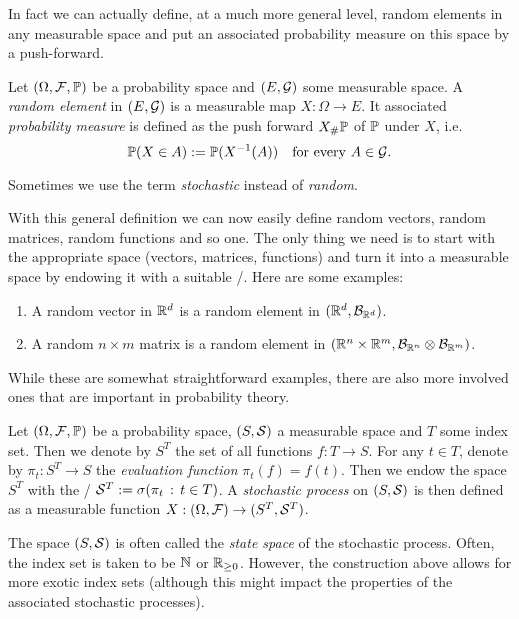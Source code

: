 In fact we can actually define, at a much more general level, random elements in any measurable space and put an associated probability measure on this space by a push-forward.

\begin{definition}
Let $(\Omega,\mathcal F, \mathbb P)$ be a probability space and $(E,\mathcal G)$ some measurable space. A \emph{random element} in $(E,\mathcal G)$ is a measurable map $X : \Omega \to E$. It associated \emph{probability measure} is defined as the push forward $X_\# \mathbb P$ of $\mathbb P$ under $X$, i.e.
\[
	\mathbb P(X \in A) := \mathbb P(X^{-1}(A)) \quad \text{for every } A \in \mathcal G.
\]
\end{definition}

Sometimes we use the term \emph{stochastic} instead of \emph{random}. 

With this general definition we can now easily define random vectors, random matrices, random functions and so one. The only thing we need is to start with the appropriate space (vectors, matrices, functions) and turn it into a measurable space by endowing it with a suitable \sigalg/. Here are some examples:

\begin{example}
\hfill
\begin{enumerate}[label=(\alph*)]
\item A random vector in $\mathbb R^d$ is a random element in $(\mathbb R^d, \mathcal B_{\mathbb R^d})$.
\item A random $n \times m$ matrix is a random element in $(\mathbb R^n \times \mathbb R^m, \mathcal B_{\mathbb R^n} \otimes \mathcal B_{\mathbb R^m})$.
\end{enumerate}
\end{example}

While these are somewhat straightforward examples, there are also more involved ones that are important in probability theory.

\begin{example}
Let $(\Omega,\mathcal F,\mathbb P)$ be a probability space, $(S,\mathcal S)$ a measurable space and $T$ some index set. Then we denote by $S^T$ the set of all functions $f : T \to S$. For any $t \in T$, denote by $\pi_t : S^T \to S$ the \emph{evaluation function} $\pi_t(f) = f(t)$. Then we endow the space $S^T$ with the \sigalg/ $\mathcal S^T := \sigma(\pi_t \, : \, t\in T)$. A \emph{stochastic process} on $(S,\mathcal S)$ is then defined as a measurable function $X : (\Omega,\mathcal F) \to (S^T, \mathcal S^T)$.

The space $(S,\mathcal S)$ is often called the \emph{state space} of the stochastic process. Often, the index set is taken to be $\mathbb N$ or $\mathbb R_{\ge 0}$. However, the construction above allows for more exotic index sets (although this might impact the properties of the associated stochastic processes).
\end{example}

